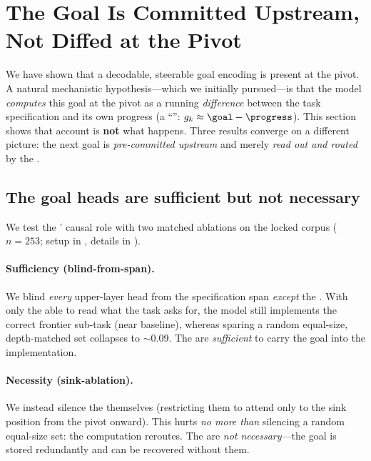 \section{The Goal Is Committed Upstream, Not Diffed at the Pivot}
\label{sec:mechanism}

We have shown that a decodable, steerable goal encoding is present at the pivot. A natural mechanistic
hypothesis---which we initially pursued---is that the model \emph{computes} this goal at the pivot as a
running \emph{difference} between the task specification and its own progress (a ``\diffmodel'':
$g_k \approx \goal - \progress$). This section shows that account is \textbf{not} what happens. Three
results converge on a different picture: the next goal is \emph{pre-committed upstream} and merely
\emph{read out and routed} by the \goalheads.

\subsection{The goal heads are sufficient but not necessary}
\label{sec:mechanism:ablation}

We test the \goalheads' causal role with two matched ablations on the locked corpus ($n{=}253$; setup in
, details in ).

\paragraph{Sufficiency (blind-from-span).} We blind \emph{every} upper-layer head from the specification
span \emph{except} the \goalheads. With only the \goalheads able to read what the task asks for, the
model still implements the correct frontier sub-task (near baseline), whereas sparing a random
equal-size, depth-matched set collapses to $\sim$0.09. The \goalheads are \emph{sufficient} to carry the
goal into the implementation.

\paragraph{Necessity (sink-ablation).} We instead silence the \goalheads themselves (restricting them to
attend only to the sink position from the pivot onward). This hurts \emph{no more than} silencing a
random equal-size set: the computation reroutes. The \goalheads are \emph{not necessary}---the goal is
stored redundantly and can be recovered without them.

